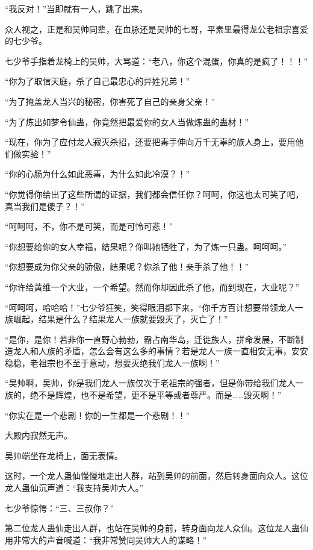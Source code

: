 \begin{this_body}
“我反对！”当即就有一人，跳了出来。

众人视之，正是和吴帅同辈，在血脉还是吴帅的七哥，平素里最得龙公老祖宗喜爱的七少爷。

七少爷手指着龙椅上的吴帅，大骂道：“老八，你这个混蛋，你真的是疯了！！！”

“你为了取信天庭，杀了自己最忠心的异姓兄弟！”

“为了掩盖龙人当兴的秘密，你害死了自己的亲身父亲！”

“为了炼出如梦令仙蛊，你竟然把最爱你的女人当做炼蛊的蛊材！”

“现在，你为了应付龙人寂灭杀招，还要把毒手伸向万千无辜的族人身上，要用他们做实验！”

“你的心肠为什么如此恶毒，为什么如此冷漠？！”

“你觉得你给出了这些所谓的证据，我们都会信任你？呵呵，你这也太可笑了吧，真当我们是傻子？！”

“呵呵呵，不，你不是可笑，而是可怜可悲！”

“你想要给你的女人幸福，结果呢？你叫她牺牲了，为了炼一只蛊。呵呵呵。”

“你想要成为你父亲的骄傲，结果呢？你杀了他！亲手杀了他！！”

“你许给黄维一个大业，一个希望。然而你却因此杀了他，而到现在，大业呢？”

“呵呵呵，哈哈哈！”七少爷狂笑，笑得眼泪都下来，“你千方百计想要带领龙人一族崛起，结果是什么？结果龙人一族就要毁灭了，灭亡了！”

“是你，是你！若非你一直野心勃勃，霸占南华岛，迁徙族人，拼命发展，不断制造龙人和人族的矛盾，怎么会有这么多的事情？若是龙人一族一直相安无事，安安稳稳，老祖宗也不至于意动，想要灭绝我们龙人一族啊！”

“吴帅啊，吴帅，你是我们龙人一族仅次于老祖宗的强者，但是你带给我们龙人一族的，绝不是辉煌，也不是希望，更不是平等或者尊严。而是……毁灭啊！”

“你实在是一个悲剧！你的一生都是一个悲剧！！”

大殿内寂然无声。

吴帅端坐在龙椅上，面无表情。

这时，一个龙人蛊仙慢慢地走出人群，站到吴帅的前面，然后转身面向众人。这位龙人蛊仙沉声道：“我支持吴帅大人。”

七少爷惊愕：“三、三叔你？”

第二位龙人蛊仙走出人群，也站在吴帅的身前，转身面向龙人众仙。这位龙人蛊仙用非常大的声音喊道：“我非常赞同吴帅大人的谋略！”


\end{this_body}
